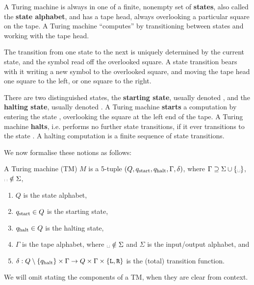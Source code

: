 A Turing machine is always in one of a finite, nonempty set of \textbf{states},
also called the \textbf{state alphabet}, and has a tape head, always
overlooking a particular square on the tape. A Turing machine ``computes'' by
transitioning between states and working with the tape head.

The transition from one state to the next is uniquely determined by the current
state, and the symbol read off the overlooked square. A state transition bears
with it writing a new symbol to the overlooked square, and moving the tape head
one square to the left, or one square to the right.

There are two distinguished states, the \textbf{starting state}, usually
denoted \qstart, and the \textbf{halting state}, usually denoted \qhalt. A
Turing machine \textbf{starts} a computation by entering the state \qstart,
overlooking the square at the left end of the tape. A Turing machine
\textbf{halts}, i.e.  performs no further state transitions, if it ever
transitions to the state \qhalt. A halting computation is a finite sequence of
state transitions.

We now formalise these notions as follows:

\begin{definition} A Turing machine (TM) $M$ is a 5-tuple
$\mathopen{}\left({Q,q_{\text{start}},q_{\text{halt}},\Gamma, \delta}\right)\mathclose{}$, where $\Gamma\supseteq\Sigma\cup\set{\blank}$, $\blank\notin\Sigma$,

\begin{enumerate}

\item $Q$ is the state alphabet,

\item $q_{\text{start}} \in Q$ is the starting state,

\item $q_{\text{halt}} \in Q$ is the halting state,

\item $\Gamma$ is the tape alphabet, where $\blank\notin
\Sigma$ and $\Sigma$ is the input/output alphabet, and

\item $\delta : Q \setminus \mathopen{}\left\{{q_{\text{halt}}}\right\}\mathclose{} \times \Gamma \rightarrow Q \times
\Gamma \times \mathopen{}\left\{{\mathtt{L}, \mathtt{R}}\right\}\mathclose{}$ is the (total) transition function.

\end{enumerate}

We will omit stating the components of a TM, when they are clear from context.

\end{definition}

